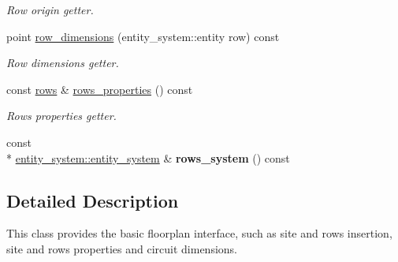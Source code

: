 \begin{DoxyCompactItemize}
\begin{DoxyCompactList}\small\item\em Row origin getter. \end{DoxyCompactList}\item 
point \hyperlink{classophidian_1_1floorplan_1_1floorplan_af01532f9fb788a82d0504fbdbea6aa6f}{row\-\_\-dimensions} (entity\-\_\-system\-::entity row) const 
\begin{DoxyCompactList}\small\item\em Row dimensions getter. \end{DoxyCompactList}\item 
const \hyperlink{classophidian_1_1floorplan_1_1rows}{rows} \& \hyperlink{classophidian_1_1floorplan_1_1floorplan_a7afdd1bd041f85a4e404e6524bdfcc13}{rows\-\_\-properties} () const 
\begin{DoxyCompactList}\small\item\em Rows properties getter. \end{DoxyCompactList}\item 
\hypertarget{classophidian_1_1floorplan_1_1floorplan_afd1531bab45111b80e43bde97336ce30}{const \\*
\hyperlink{classophidian_1_1entity__system_1_1entity__system}{entity\-\_\-system\-::entity\-\_\-system} \& {\bfseries rows\-\_\-system} () const }\label{classophidian_1_1floorplan_1_1floorplan_afd1531bab45111b80e43bde97336ce30}

\end{DoxyCompactItemize}


\subsection{Detailed Description}
This class provides the basic floorplan interface, such as site and rows insertion, site and rows properties and circuit dimensions. 

